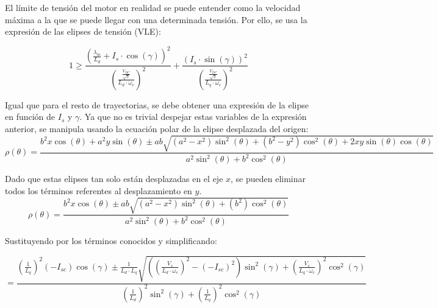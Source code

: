 El límite de tensión del motor en realidad se puede entender como la velocidad máxima a la que se puede llegar con una determinada tensión. Por ello, se usa la expresión de las elipses de tensión (VLE):

\begin{equation}
1 \geq \frac{\left(\frac{\lambda_m}{L_d}+I_s \cdot \cos(\gamma)\right)^2}{\left(\frac{\frac{V_{DC}}{\sqrt{3}}}{L_d\cdot\omega_e}\right)^2}+\frac{(I_s \cdot \sin(\gamma))^2}{\left(\frac{\frac{V_{DC}}{\sqrt{3}}}{L_q\cdot\omega_e}\right)^2}
\end{equation}

Igual que para el resto de trayectorias, se debe obtener una expresión de la elipse en función de $I_s$ y $\gamma$. Ya que no es trivial despejar estas variables de la expresión anterior, se manipula usando la ecuación polar de la elipse desplazada del origen:
\begin{equation}
\rho(\theta) = \frac{b^2 x \cos (\theta ) + a^2 y \sin (\theta )\pm a b \sqrt{\left(a^2-x^2\right) \sin ^2(\theta )+\left(b^2-y^2\right) \cos ^2(\theta )+2 x y \sin (\theta ) \cos (\theta )}}{a^2 \sin ^2(\theta )+b^2 \cos ^2(\theta )}
\end{equation}

Dado que estas elipses tan solo están desplazadas en el eje $x$, se pueden eliminar todos los términos referentes al desplazamiento en $y$.
\begin{equation}
\rho(\theta) = \frac{b^2 x \cos (\theta ) \pm a b \sqrt{\left(a^2-x^2\right) \sin ^2(\theta )+\left(b^2\right) \cos ^2(\theta )}}{a^2 \sin ^2(\theta )+b^2 \cos ^2(\theta )}
\end{equation}

Sustituyendo por los términos conocidos y simplificando:

\begin{equation}
	=\frac{\left(\frac{1}{L_q}\right)^2\left(-I_{s c}\right) \cos (\gamma) \pm \frac{1}{L_d \cdot L_q} \sqrt{\left(\left(\frac{V_s}{L_d \cdot \omega_e}\right)^2-\left(-I_{s c}\right)^2\right) \sin ^2(\gamma)+\left(\frac{V_s}{L_q \cdot \omega_e}\right)^2 \cos ^2(\gamma)}}{\left(\frac{1}{L_d}\right)^2 \sin ^2(\gamma)+\left(\frac{1}{L_q}\right)^2 \cos ^2(\gamma)}
\end{equation}


